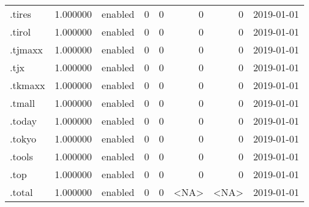 \begin{tabular}{lrlrrrrl}
.tires                    &          1.000000 &         enabled &                           0 &                           0 &                           0 &                   0 &           2019-01-01 \\
.tirol                    &          1.000000 &         enabled &                           0 &                           0 &                           0 &                   0 &           2019-01-01 \\
.tjmaxx                   &          1.000000 &         enabled &                           0 &                           0 &                           0 &                   0 &           2019-01-01 \\
.tjx                      &          1.000000 &         enabled &                           0 &                           0 &                           0 &                   0 &           2019-01-01 \\
.tkmaxx                   &          1.000000 &         enabled &                           0 &                           0 &                           0 &                   0 &           2019-01-01 \\
.tmall                    &          1.000000 &         enabled &                           0 &                           0 &                           0 &                   0 &           2019-01-01 \\
.today                    &          1.000000 &         enabled &                           0 &                           0 &                           0 &                   0 &           2019-01-01 \\
.tokyo                    &          1.000000 &         enabled &                           0 &                           0 &                           0 &                   0 &           2019-01-01 \\
.tools                    &          1.000000 &         enabled &                           0 &                           0 &                           0 &                   0 &           2019-01-01 \\
.top                      &          1.000000 &         enabled &                           0 &                           0 &                           0 &                   0 &           2019-01-01 \\
.total                    &          1.000000 &         enabled &                           0 &                           0 &                        <NA> &                <NA> &           2019-01-01 \\

\end{tabular}
